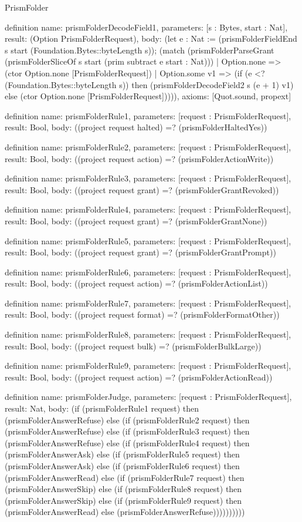 \begin{lexlean}{PrismFolder}
\begin{semanticmodule}
definition{
  name: prismFolderDecodeField1,
  parameters: [s : Bytes, start : Nat],
  result: (Option PrismFolderRequest),
  body: (let e : Nat := (prismFolderFieldEnd s start (Foundation.Bytes::byteLength s)); (match (prismFolderParseGrant (prismFolderSliceOf s start (prim subtract e start : Nat)))
    | Option.none => (ctor Option.none [PrismFolderRequest])
    | Option.some v1 => (if (e <? (Foundation.Bytes::byteLength s)) then (prismFolderDecodeField2 s (e + 1) v1) else (ctor Option.none [PrismFolderRequest])))),
  axioms: [Quot.sound, propext]
}

definition{
  name: prismFolderRule1,
  parameters: [request : PrismFolderRequest],
  result: Bool,
  body: ((project request halted) =? (prismFolderHaltedYes))
}

definition{
  name: prismFolderRule2,
  parameters: [request : PrismFolderRequest],
  result: Bool,
  body: ((project request action) =? (prismFolderActionWrite))
}

definition{
  name: prismFolderRule3,
  parameters: [request : PrismFolderRequest],
  result: Bool,
  body: ((project request grant) =? (prismFolderGrantRevoked))
}

definition{
  name: prismFolderRule4,
  parameters: [request : PrismFolderRequest],
  result: Bool,
  body: ((project request grant) =? (prismFolderGrantNone))
}

definition{
  name: prismFolderRule5,
  parameters: [request : PrismFolderRequest],
  result: Bool,
  body: ((project request grant) =? (prismFolderGrantPrompt))
}

definition{
  name: prismFolderRule6,
  parameters: [request : PrismFolderRequest],
  result: Bool,
  body: ((project request action) =? (prismFolderActionList))
}

definition{
  name: prismFolderRule7,
  parameters: [request : PrismFolderRequest],
  result: Bool,
  body: ((project request format) =? (prismFolderFormatOther))
}

definition{
  name: prismFolderRule8,
  parameters: [request : PrismFolderRequest],
  result: Bool,
  body: ((project request bulk) =? (prismFolderBulkLarge))
}

definition{
  name: prismFolderRule9,
  parameters: [request : PrismFolderRequest],
  result: Bool,
  body: ((project request action) =? (prismFolderActionRead))
}

definition{
  name: prismFolderJudge,
  parameters: [request : PrismFolderRequest],
  result: Nat,
  body: (if (prismFolderRule1 request) then (prismFolderAnswerRefuse) else (if (prismFolderRule2 request) then (prismFolderAnswerRefuse) else (if (prismFolderRule3 request) then (prismFolderAnswerRefuse) else (if (prismFolderRule4 request) then (prismFolderAnswerAsk) else (if (prismFolderRule5 request) then (prismFolderAnswerAsk) else (if (prismFolderRule6 request) then (prismFolderAnswerRead) else (if (prismFolderRule7 request) then (prismFolderAnswerSkip) else (if (prismFolderRule8 request) then (prismFolderAnswerSkip) else (if (prismFolderRule9 request) then (prismFolderAnswerRead) else (prismFolderAnswerRefuse))))))))))
}


\end{semanticmodule}
\end{lexlean}
